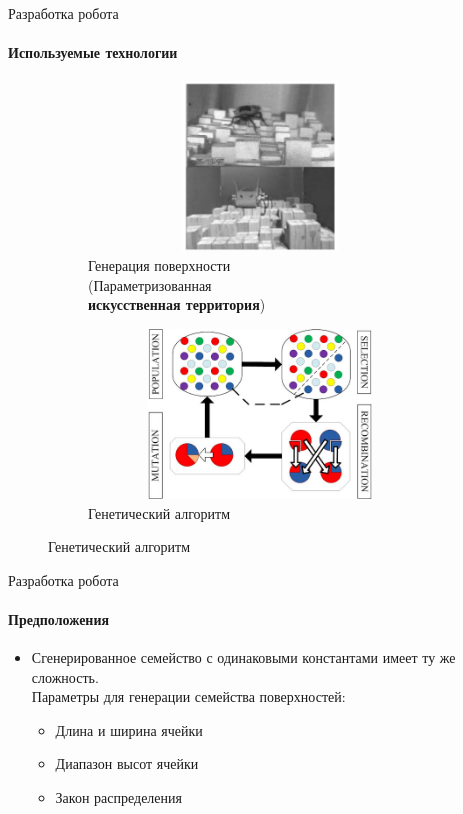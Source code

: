 \documentclass[aspectratio=169,xcolor=table]{beamer}
\begin{document}
\begin{frame}[c]{Разработка робота}
    \framesubtitle{Используемые технологии}
    \vspace{-0.7cm}
    \begin{figure}[H]
        \begin{subfigure}[t]{0.45\textwidth}
            \centering\includegraphics[height=4.5cm,width=1\textwidth,keepaspectratio]{c1_paper.png}
            \caption*{\small Генерация поверхности \\ (Параметризованная \\ \textbf{искусственная территория})}
        \end{subfigure}
        \begin{subfigure}[t]{0.45\textwidth}
            \centering\includegraphics[height=4.5cm,width=1\textwidth,keepaspectratio]{gen_algo.jpg}
            \caption*{ \small Генетический алгоритм}
        \end{subfigure}
        \hfill
    \end{figure}
\end{frame}

\begin{frame}[t]{Разработка робота}
    \framesubtitle{Предположения}
    \large
    \begin{itemize}
        \item Сгенерированное семейство с одинаковыми константами имеет ту же сложность. 
        \\ 
        Параметры для генерации семейства поверхностей:
              \begin{itemize}
                \large
                  \item Длина и ширина ячейки
                  \item Диапазон высот ячейки
                  \item Закон распределения
              \end{itemize}
    \end{itemize}
\end{frame}
\end{document}
